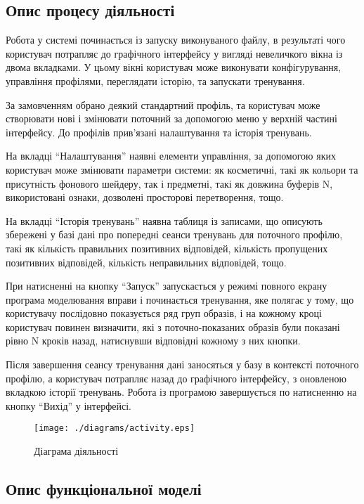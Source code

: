 \subsection{Опис процесу діяльності}

Робота у системі починається із запуску виконуваного файлу, в результаті чого користувач потрапляє до графічного інтерфейсу у вигляді невеличкого вікна із двома вкладками. У цьому вікні користувач може виконувати конфігурування, управління профілями, переглядати історію, та запускати тренування.

За замовченням обрано деякий стандартний профіль, та користувач може створювати нові і змінювати поточний за допомогою меню у верхній частині інтерфейсу. До профілів прив'язані налаштування та історія тренувань.

На вкладці ``Налаштування'' наявні елементи управління, за допомогою яких користувач може змінювати параметри системи: як косметичні, такі як кольори та присутність фонового шейдеру, так і предметні, такі як довжина буферів N, використовані ознаки, дозволені просторові перетворення, тощо.

На вкладці ``Історія тренувань'' наявна таблиця із записами, що описують збережені у базі дані про попередні сеанси тренувань для поточного профілю, такі як кількість правильних позитивних відповідей, кількість пропущених позитивних відповідей, кількість неправильних відповідей, тощо.

При натисненні на кнопку ``Запуск'' запускається у режимі повного екрану програма моделювання вправи і починається тренування, яке полягає у тому, що користувачу послідовно показується ряд груп образів, і на кожному кроці користувач повинен визначити, які з поточно-показаних образів були показані рівно N кроків назад, натиснувши відповідні кожному з них кнопки.

Після завершення сеансу тренування дані заносяться у базу в контексті поточного профілю, а користувач потрапляє назад до графічного інтерфейсу, з оновленою вкладкою історії тренувань. Робота із програмою завершується по натисненню на кнопку ``Вихід'' у інтерфейсі.

\begin{figure}[here]
  \caption{Діаграма діяльності}
  \centering\texttt{[image: ./diagrams/activity.eps]}
  \label{fig:activity}
\end{figure}

\subsection{Опис функціональної моделі}

